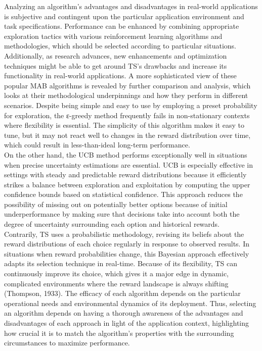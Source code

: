 \documentclass[a4paper,11pt,onecolumn]{article}
\begin{document}
Analyzing an algorithm's advantages and disadvantages in real-world applications is subjective and contingent upon the particular application environment and task specifications. Performance can be enhanced by combining appropriate exploration tactics with various reinforcement learning algorithms and methodologies, which should be selected according to particular situations. Additionally, as research advances, new enhancements and optimization techniques might be able to get around TS's drawbacks and increase its functionality in real-world applications.  A more sophisticated view of these popular MAB algorithms is revealed by further comparison and analysis, which looks at their methodological underpinnings and how they perform in different scenarios. Despite being simple and easy to use by employing a preset probability for exploration, the ε-greedy method frequently fails in non-stationary contexts where flexibility is essential. The simplicity of this algorithm makes it easy to tune, but it may not react well to changes in the reward distribution over time, which could result in less-than-ideal long-term performance.\\
On the other hand, the UCB method performs exceptionally well in situations when precise uncertainty estimations are essential. UCB is especially effective in settings with steady and predictable reward distributions because it efficiently strikes a balance between exploration and exploitation by computing the upper confidence bounds based on statistical confidence. This approach reduces the possibility of missing out on potentially better options because of initial underperformance by making sure that decisions take into account both the degree of uncertainty surrounding each option and historical rewards.\\
Contrarily, TS uses a probabilistic methodology, revising its beliefs about the reward distributions of each choice regularly in response to observed results. In situations when reward probabilities change, this Bayesian approach effectively adapts its selection technique in real-time. Because of its flexibility, TS can continuously improve its choice, which gives it a major edge in dynamic, complicated environments where the reward landscape is always shifting (Thompson, 1933). The efficacy of each algorithm depends on the particular operational needs and environmental dynamics of its deployment. Thus, selecting an algorithm depends on having a thorough awareness of the advantages and disadvantages of each approach in light of the application context, highlighting how crucial it is to match the algorithm's properties with the surrounding circumstances to maximize performance.\\ 
\end{document}
